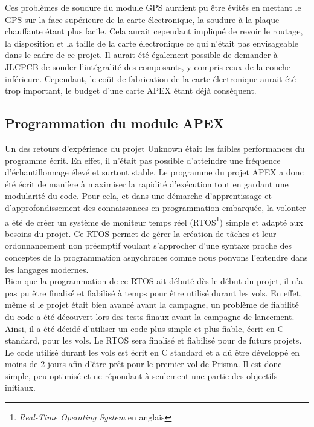 \documentclass{article}
\begin{document}
Ces problèmes de soudure du module GPS auraient pu être évités en mettant le GPS sur la
face supérieure de la carte électronique, la soudure à la plaque chauffante étant plus
facile. Cela aurait cependant impliqué de revoir le routage, la disposition et la taille
de la carte électronique ce qui n'était pas envisageable dans le cadre de ce projet.
Il aurait été également possible de demander à JLCPCB de souder l'intégralité des
composants, y compris ceux de la couche inférieure. Cependant, le coût de fabrication
de la carte électronique aurait été trop important, le budget d'une carte APEX étant
déjà conséquent.

\newpage

\subsection{Programmation du module APEX}

Un des retours d'expérience du projet Unknown était les faibles performances du programme
écrit. En effet, il n'était pas possible d'atteindre une fréquence d'échantillonnage
élevé et surtout stable. Le programme du projet APEX a donc été écrit de manière à
maximiser la rapidité d'exécution tout en gardant une modularité du code. Pour cela, et
dans une démarche d'apprentissage et d'approfondissement des connaissances en
programmation embarquée, la volonter a été de créer un système de moniteur temps
réel (RTOS\footnote{\textit{Real-Time Operating System} en anglais}) simple et adapté
aux besoins du projet. Ce RTOS permet de gérer la création de tâches et leur ordonnancement
non préemptif voulant s'approcher d'une syntaxe proche des conceptes de la programmation
asnychrones comme nous ponvons l'entendre dans les langages modernes.\\

Bien que la programmation de ce RTOS ait débuté dès le début du projet, il n'a pas pu être
finalisé et fiabilisé à temps pour être utilisé durant les vols. En effet, même si le projet
était bien avancé avant la campagne, un problème de fiabilité du code a été découvert lors des
tests finaux avant la campagne de lancement. Ainsi, il a été décidé d'utiliser un code plus
simple et plus fiable, écrit en C standard, pour les vols. Le RTOS sera finalisé et
fiabilisé pour de futurs projets.\\

Le code utilisé durant les vols est écrit en C standard et a dû être développé en moins de 2
jours afin d'être prêt pour le premier vol de Prisma. Il est donc simple, peu optimisé et ne
répondant à seulement une partie des objectifs initiaux.
\end{document}
